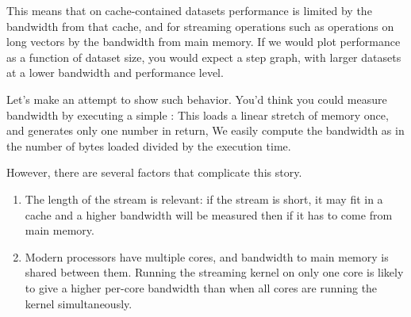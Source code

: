 This means that on cache-contained datasets performance is limited by the bandwidth
from that cache,
and for streaming operations such as operations on long vectors
by the bandwidth from main memory.
If we would plot performance as a function of dataset size, you would expect
a step graph, with larger datasets at a lower bandwidth and performance level.

Let's make an attempt to show such behavior.
You'd think you could measure bandwidth by executing
a simple :
%
%
This loads a linear stretch of memory once, and generates
only one number in return,
We easily compute the bandwidth as in the number of bytes loaded
divided by the execution time.

However, there are several factors that complicate this story.
\begin{enumerate}
\item The length of the stream is relevant: if the stream is short,
  it may fit in a cache and a higher bandwidth will be measured
  then if it has to come from main memory.
\item Modern processors have multiple cores,
  and bandwidth to main memory is shared between them.
  Running the streaming kernel on only one core is likely to give
  a higher per-core bandwidth
  than when all cores are running the kernel simultaneously.
\end{enumerate}


